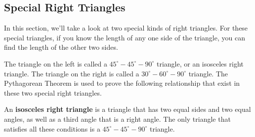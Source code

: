 
\subsection{Special Right Triangles}
\label{sub_sec:special_right_triangles}

In this section, we'll take a look at two special kinds of right triangles. For
these special triangles, if you know the length of any one side of the
triangle, you can find the length of the other two sides.

\begin{figure}[htpb]
	\centering


	\label{fig:45_45_90_and_30_60_90_triangle}
\end{figure}

The triangle on the left is called a $45^{\circ}-45^{\circ}-90^{\circ}$
triangle, or an isosceles right triangle. The triangle on the right is called a
$30^{\circ}-60^{\circ}-90^{\circ}$ triangle. The Pythagorean Theorem is used to
prove the following relationship that exist in these two special right
triangles.

\begin{definition}
	\label{def:isosceles_right_triangle}

	An \textbf{isosceles right triangle} is a triangle that has two equal sides
	and two equal angles, as well as a third angle that is a right angle. The
	only triangle that satisfies all these conditions is a
	$45^{\circ}-45^{\circ}-90^{\circ}$ triangle.
\end{definition}

